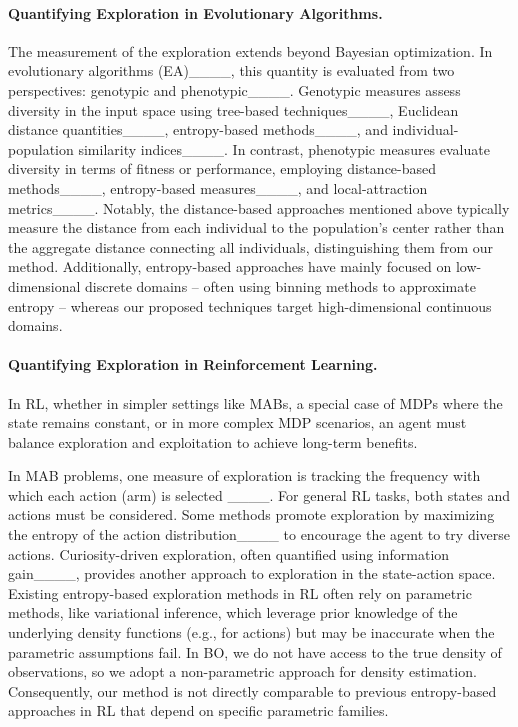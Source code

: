 \paragraph{Quantifying Exploration in Evolutionary Algorithms.}
The measurement of the exploration extends beyond Bayesian optimization. In evolutionary algorithms (EA)____, this quantity is evaluated from two perspectives: genotypic and phenotypic____. Genotypic measures assess diversity in the input space using tree-based techniques____, Euclidean distance quantities____, entropy-based methods____, and individual-population similarity indices____. In contrast, phenotypic measures evaluate diversity in terms of fitness or performance, employing distance-based methods____, entropy-based measures____, and local-attraction metrics____. Notably, the distance-based approaches mentioned above typically measure the distance from each individual to the population's center rather than the aggregate distance connecting all individuals, distinguishing them from our method. Additionally, entropy-based approaches have mainly focused on low-dimensional discrete domains -- often using binning methods to approximate entropy -- whereas our proposed techniques target high-dimensional continuous domains.

\paragraph{Quantifying Exploration in Reinforcement Learning.}
In \ac{RL}, whether in simpler settings like \acp{MAB}, a special case of \acp{MDP} where the state remains constant, or in more complex \ac{MDP} scenarios, an agent must balance exploration and exploitation to achieve long-term benefits.

In \ac{MAB} problems, one measure of exploration is tracking the frequency with which each action (arm) is selected ____. For general \ac{RL} tasks, both states and actions must be considered. 
Some methods promote exploration by maximizing the entropy of the action distribution____ to encourage the agent to try diverse actions. 
Curiosity-driven exploration, often quantified using information gain____, provides another approach to exploration in the state-action space. 
Existing entropy-based exploration methods in \ac{RL} often rely on parametric methods, like variational inference, which leverage prior knowledge of the underlying density functions (e.g., for actions) but may be inaccurate when the parametric assumptions fail. In \ac{BO}, we do not have access to the true density of observations, so we adopt a non-parametric approach for density estimation. Consequently, our method is not directly comparable to previous entropy-based approaches in \ac{RL} that depend on specific parametric families.